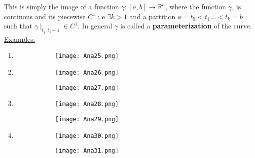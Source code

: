 \documentclass[8pt]{extreport}
\newcommand{\R}{\mathbb{R}}
\begin{document}
This is simply the image of a function $\gamma:[a,b] \to \R^n$, where the function $\gamma$, is continous and its piecewise $C^1$ i.e $\exists k > 1$ and a partition $a = t_0 < t_1 ... <t_k = b$ such that $\gamma \mid_{t_j,t_j+1} \in C^1$. In general $\gamma$ is called a \textbf{parameterization} of the curve.\\
\underline{Examples:}
\begin{enumerate}
\item
\begin{figure}[H]
\centering
\begin{subfigure}[b]{0.4\linewidth}
\texttt{[image: Ana25.png]}
\end{subfigure}
\end{figure}
\item\begin{figure}[H]
\centering
\begin{subfigure}[b]{0.4\linewidth}
\texttt{[image: Ana26.png]}
\end{subfigure}
\begin{subfigure}[b]{0.4\linewidth}
\texttt{[image: Ana27.png]}
\end{subfigure}
\end{figure}
\item\begin{figure}[H]
\centering
\begin{subfigure}[b]{0.4\linewidth}
\texttt{[image: Ana28.png]}
\end{subfigure}
\begin{subfigure}[b]{0.4\linewidth}
\texttt{[image: Ana29.png]}
\end{subfigure}
\end{figure}
\item\begin{figure}[H]
\centering
\begin{subfigure}[b]{0.4\linewidth}
\texttt{[image: Ana30.png]}
\end{subfigure}
\begin{subfigure}[b]{0.4\linewidth}
\texttt{[image: Ana31.png]}
\end{subfigure}
\end{figure}
\end{enumerate}
\end{document}
